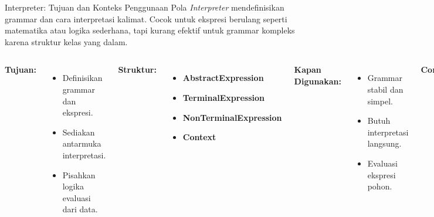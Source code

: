 \documentclass[aspectratio=169, table]{beamer}
\begin{document}
\begin{frame}{Interpreter: Tujuan dan Konteks Penggunaan}
	\vspace{15pt}
	Pola \textit{Interpreter} mendefinisikan grammar dan cara interpretasi kalimat. Cocok untuk ekspresi berulang seperti matematika atau logika sederhana, tapi kurang efektif untuk grammar kompleks karena struktur kelas yang dalam.
	
	\vspace{5pt}
	\begin{columns}[T]
		\textbf{Tujuan:}
		\begin{itemize}
			\item Definisikan grammar dan ekspresi.
			\item Sediakan antarmuka interpretasi.
			\item Pisahkan logika evaluasi dari data.
		\end{itemize}
		
		\textbf{Struktur:}
		\begin{itemize}
			\item \textbf{AbstractExpression}
			\item \textbf{TerminalExpression}
			\item \textbf{NonTerminalExpression}
			\item \textbf{Context}
		\end{itemize}
		
		\textbf{Kapan Digunakan:}
		\begin{itemize}
			\item Grammar stabil dan simpel.
			\item Butuh interpretasi langsung.
			\item Evaluasi ekspresi pohon.
		\end{itemize}
		
		\textbf{Contoh:}
		\begin{itemize}
			\item Kalkulator ekspresi.
			\item Filter logika sederhana.
			\item Mini query pada data.
			\item Bahasa skrip/DSL kecil.
		\end{itemize}
	\end{columns}
	
\end{frame}
\end{document}
